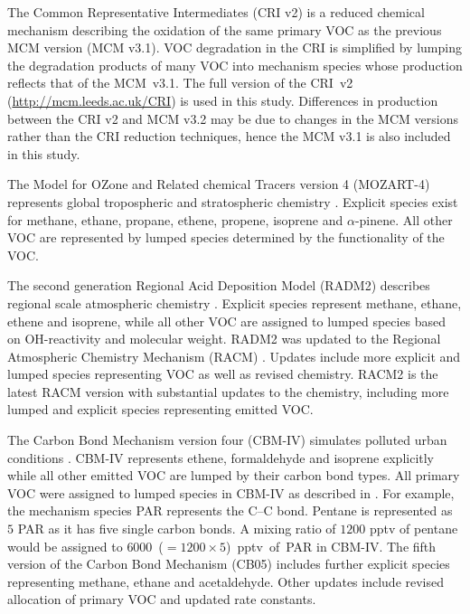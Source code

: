 The Common Representative Intermediates (CRI v2) \citep{Jenkin:2008} is a reduced chemical mechanism describing the oxidation of the same primary VOC as the previous MCM version (MCM v3.1). 
VOC degradation in the CRI is simplified by lumping the degradation products of many VOC into mechanism species whose  production reflects that of the \mbox{MCM v3.1}. 
The full version of the \mbox{CRI v2} (\url{http://mcm.leeds.ac.uk/CRI}) is used in this study.
Differences in  production between the CRI v2 and MCM v3.2 may be due to changes in the MCM versions rather than the CRI reduction techniques, hence the MCM v3.1 is also included in this study.

The Model for OZone and Related chemical Tracers version 4 (MOZART-4) represents global tropospheric and stratospheric chemistry \citep{Emmons:2010}. 
Explicit species exist for methane, ethane, propane, ethene, propene, isoprene and $\alpha$-pinene.
All other VOC are represented by lumped species determined by the functionality of the VOC.

The second generation Regional Acid Deposition Model (RADM2) describes regional scale atmospheric chemistry \citep{Stockwell:1990}. 
Explicit species represent methane, ethane, ethene and isoprene, while all other VOC are assigned to lumped species based on OH-reactivity and molecular weight.
RADM2 was updated to the Regional Atmospheric Chemistry Mechanism (RACM) \citep{Stockwell:1997}. 
Updates include more explicit and lumped species representing VOC as well as revised chemistry.
RACM2 is the latest RACM version \citep{Goliff:2013} with substantial updates to the chemistry, including more lumped and explicit species representing emitted VOC.

The Carbon Bond Mechanism version four (CBM-IV) simulates polluted urban conditions \citep{Gery:1989}. 
CBM-IV represents ethene, formaldehyde and isoprene explicitly while all other emitted VOC are lumped by their carbon bond types. 
All primary VOC were assigned to lumped species in CBM-IV as described in \citet{Hogo:1989}. 
For example, the mechanism species PAR represents the C--C bond.
Pentane is represented as $5$ PAR as it has five single carbon bonds.
A mixing ratio of $1200$ pptv of pentane would be assigned to \mbox{$6000$ ($= 1200 \times 5$) pptv of PAR} in CBM-IV.
The fifth version of the Carbon Bond Mechanism (CB05) \citep{Yarwood:2005} includes further explicit species representing methane, ethane and acetaldehyde. 
Other updates include revised allocation of primary VOC and updated rate constants.

